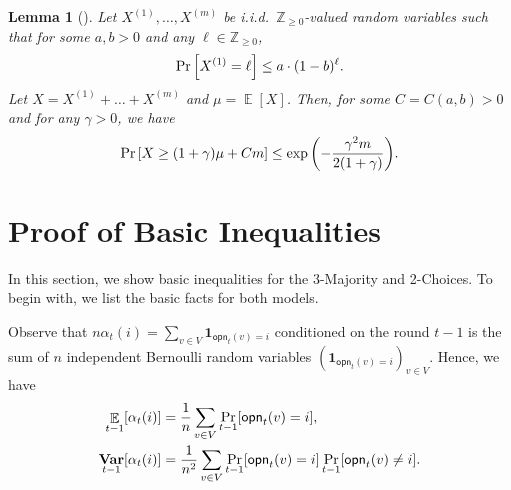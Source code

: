 \documentclass[letterpaper,11pt]{article}
\newtheorem{lemma}[theorem]{Lemma}
\DeclarePairedDelimiter{\sbra}{\lbrack}{\rbrack} %
\newcommand{\indicator}{\mathbf{1}}
\DeclareMathOperator*{\E}{\mathbb{E}}
\DeclareMathOperator*{\Var}{\mathbf{Var}}
\newcommand{\Int}{\mathbb{Z}}
\newcommand{\opinion}{\mathsf{opn}}
\begin{document}
\begin{lemma}[\mbox{\cite[Lemma 7]{Doerr11}}] \label{lem:concentration exponentially decay}
    Let $ X^{(1)},\dots,X^{(m)} $ be i.i.d.\ $ \Int_{\ge 0} $-valued random variables such that for some $ a,b>0 $ and any $ \ell\in \Int_{\ge 0} $,
    \begin{align*}
        \Pr\qty[ X^{(1)} = \ell ] \le a\cdot (1-b)^{\ell}.
    \end{align*}
    Let $ X = X^{(1)} + \dots + X^{(m)} $ and $ \mu = \E[X] $.
    Then, for some $ C=C(a,b) > 0$ and for any $ \gamma > 0$, we have
    \begin{align*}
        \Pr\qty[ X \ge (1+\gamma) \mu + Cm ] \le \exp\qty( -\frac{\gamma^2 m}{2(1+\gamma)} ).
    \end{align*}
\end{lemma}


\section{Proof of Basic Inequalities} \label{sec:proof of basic inequalities}
In this section, we show basic inequalities for the 3-Majority and 2-Choices.
%
To begin with, we list the basic facts for both models.

Observe that $n\alpha_t(i)=\sum_{v\in V}\indicator_{\opinion_t(v)=i}$ conditioned on the round $t-1$ is the sum of $n$ independent Bernoulli random variables $(\indicator_{\opinion_t(v)=i})_{v\in V}$.
Hence, we have
\begin{align}
    \E_{t-1}\sbra*{\alpha_t(i)}&=\frac{1}{n}\sum_{v\in V}\Pr_{t-1}\sbra*{\opinion_t(v)=i}, \label{eq:expectation of alpha sync}\\
    \Var_{t-1}\sbra*{\alpha_t(i)}&=\frac{1}{n^2}\sum_{v\in V}\Pr_{t-1}\sbra*{\opinion_t(v)=i}\Pr_{t-1}\sbra*{\opinion_t(v)\neq i}.\label{eq:variance of alpha sync}
\end{align}
\end{document}
